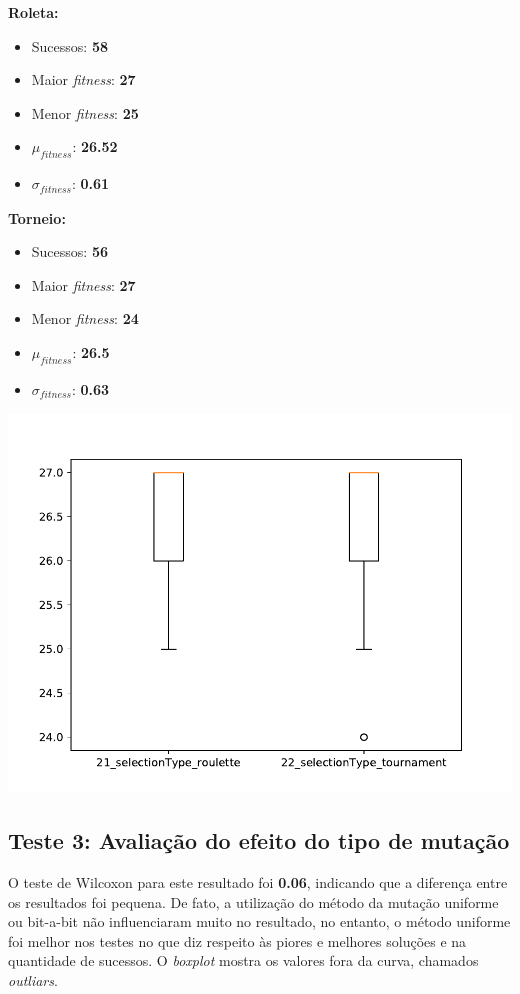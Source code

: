\documentclass[11pt,a4paper]{article}
\begin{document}
\begin{minipage}{0.25\linewidth}
\textbf{Roleta:}
\begin{itemize}
	\footnotesize
	\setlength\itemsep{0em}
	\item Sucessos: \textbf{58}
	\item Maior \textit{fitness}: \textbf{27}
	\item Menor \textit{fitness}: \textbf{25}
	\item $\mu_{\textit{fitness}}$: \textbf{26.52}
	\item $\sigma_{\textit{fitness}}$: \textbf{0.61}
\end{itemize}
\end{minipage}
\begin{minipage}{0.25\linewidth}
\textbf{Torneio:}
\begin{itemize}
	\footnotesize
	\setlength\itemsep{0em}
	\item Sucessos: \textbf{56}
	\item Maior \textit{fitness}: \textbf{27}
	\item Menor \textit{fitness}: \textbf{24}
	\item $\mu_{\textit{fitness}}$: \textbf{26.5}
	\item $\sigma_{\textit{fitness}}$: \textbf{0.63}
\end{itemize}
\end{minipage}
\begin{minipage}{0.5\linewidth}
\includegraphics[scale=0.48]{teste2.pdf} 
\end{minipage}

\subsection{Teste 3: Avaliação do efeito do tipo de mutação}
O teste de Wilcoxon para este resultado foi \textbf{0.06}, indicando que a diferença entre os resultados foi pequena. De fato, a utilização do método da mutação uniforme ou bit-a-bit não influenciaram muito no resultado, no entanto, o método uniforme foi melhor nos testes no que diz respeito às piores e melhores soluções e na quantidade de sucessos. O \textit{boxplot} mostra os valores fora da curva, chamados \textit{outliars}.\\
\end{document}
